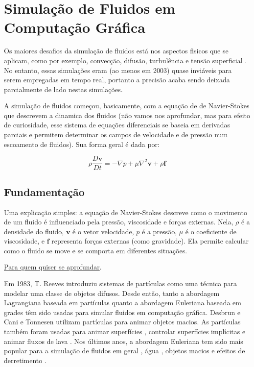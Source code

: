 \section{Simulação de Fluidos em Computação Gráfica}

Os maiores desafios da simulação de fluidos está nos aspectos fisicos que se aplicam, como por exemplo, convecção, difusão, turbulência e tensão superficial \cite{desbrun1996}. No entanto, essas simulações eram (ao menos em 2003) quase inviáveis para serem empregadas em tempo real, portanto a precisão acaba sendo deixada parcialmente de lado nestas simulações.

A simulação de fluidos começou, basicamente, com a equação de de Navier-Stokes que descrevem a dinamica dos fluidos (não vamos nos aprofundar, mas para efeito de curiosidade, esse sistema de equações diferenciais se baseia em derivadas parciais e permitem determinar os campos de velocidade e de pressão num escoamento de fluidos). Sua forma geral é dada por:


$$
\rho \frac{D\mathbf{v}}{Dt} = -\nabla p + \mu \nabla^2 \mathbf{v} + \rho \mathbf{f}
$$

\subsection{Fundamentação}

Uma explicação simples: a equação de Navier-Stokes descreve como o movimento de um fluido é influenciado pela pressão, viscosidade e forças externas. Nela, $\rho$ é a densidade do fluido, $\mathbf{v}$ é o vetor velocidade, $p$ é a pressão, $\mu$ é o coeficiente de viscosidade, e $\mathbf{f}$ representa forças externas (como gravidade). Ela permite calcular como o fluido se move e se comporta em diferentes situações.

\href{https://pt.wikipedia.org/wiki/Equa\%C3\%A7\%C3\%B5es\_de\_Navier-Stokes}{Para quem quiser se aprofundar}.

Em 1983, T. Reeves \cite{reeves1983} introduziu sistemas de partículas como uma técnica para modelar uma classe de objetos difusos. Desde então, tanto a abordagem Lagrangiana baseada em partículas quanto a abordagem Euleriana baseada em grades têm sido usadas para simular fluidos em computação gráfica. Desbrun e Cani \cite{desbrun1996} e Tonnesen \cite{tonnesen1998} utilizam partículas para animar objetos macios. As partículas também foram usadas para animar superfícies \cite{witkin1991}, controlar superfícies implícitas \cite{bloomenthal1997} e animar fluxos de lava \cite{carlson2002}. Nos últimos anos, a abordagem Euleriana tem sido mais popular para a simulação de fluidos em geral \cite{fedkiw2001}, água \cite{stam1999, foster1996, enright2002}, objetos macios \cite{muller2002} e efeitos de derretimento \cite{carlson2002}.

